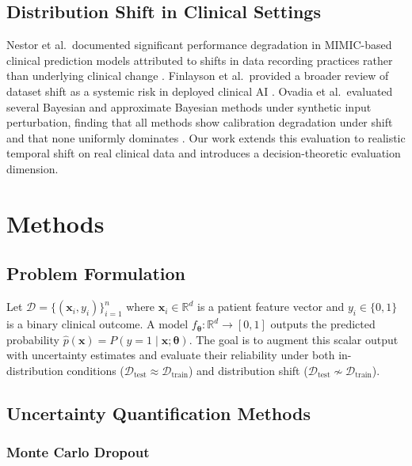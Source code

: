 \documentclass[11pt,a4paper]{article}
\newcommand{\calD}{\mathcal{D}}
\newcommand{\bx}{\mathbf{x}}
\newcommand{\btheta}{\boldsymbol{\theta}}
\newcommand{\hatP}{\hat{p}}
\begin{document}
\subsection{Distribution Shift in Clinical Settings}

Nestor et al.\ documented significant performance degradation in MIMIC-based clinical prediction models attributed to shifts in data recording practices rather than underlying clinical change \citep{nestor2019}. Finlayson et al.\ provided a broader review of dataset shift as a systemic risk in deployed clinical AI \citep{finlayson2021}. Ovadia et al.\ evaluated several Bayesian and approximate Bayesian methods under synthetic input perturbation, finding that all methods show calibration degradation under shift and that none uniformly dominates \citep{ovadia2019}. Our work extends this evaluation to realistic temporal shift on real clinical data and introduces a decision-theoretic evaluation dimension.

\section{Methods}
\label{sec:methods}

\subsection{Problem Formulation}

Let $\calD = \{(\bx_i, y_i)\}_{i=1}^n$ where $\bx_i \in \mathbb{R}^d$ is a patient feature vector and $y_i \in \{0,1\}$ is a binary clinical outcome. A model $f_{\btheta} : \mathbb{R}^d \to [0,1]$ outputs the predicted probability $\hatP(\bx) = P(y=1 \mid \bx;\btheta)$. The goal is to augment this scalar output with uncertainty estimates and evaluate their reliability under both in-distribution conditions ($\calD_{\text{test}} \approx \calD_{\text{train}}$) and distribution shift ($\calD_{\text{test}} \not\sim \calD_{\text{train}}$).

\subsection{Uncertainty Quantification Methods}

\subsubsection{Monte Carlo Dropout}
\end{document}
